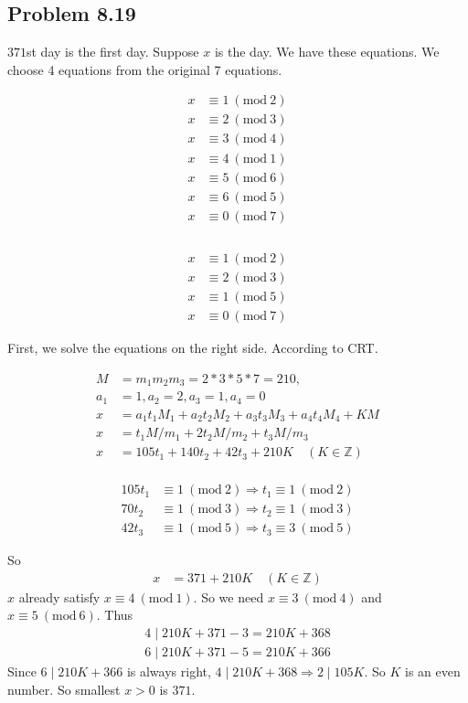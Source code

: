 \documentclass[acmlarge,screen]{acmart}
\begin{document}
\begin{CJK*}{UTF8}{gbsn}
\section{Problem 8.19}
$371$st day is the first day. Suppose $x$ is the day. We have these equations. We choose 4 equations from the original 7 equations.
\begin{multicols}{2}
\begin{align*} 
	x&\equiv1\ (\text{mod}\ 2)\\
	x&\equiv2\ (\text{mod}\ 3)\\
	x&\equiv3\ (\text{mod}\ 4)\\
	x&\equiv4\ (\text{mod}\ 1)\\
	x&\equiv5\ (\text{mod}\ 6)\\
	x&\equiv6\ (\text{mod}\ 5)\\
	x&\equiv0\ (\text{mod}\ 7)\\
\end{align*}
\columnbreak \\
\begin{align*}
	x&\equiv1\ (\text{mod}\ 2)\\
	x&\equiv2\ (\text{mod}\ 3)\\
	x&\equiv1\ (\text{mod}\ 5)\\
	x&\equiv0\ (\text{mod}\ 7)
\end{align*}
\end{multicols}
\noindent First, we solve the equations on the right side. According to CRT.
\begin{multicols}{2}
\begin{align*}
	M&=m_1m_2m_3=2*3*5*7=210,\\
	a_1&=1,a_2=2,a_3=1,a_4=0\\
	x&=a_1t_1M_1+a_2t_2M_2+a_3t_3M_3+a_4t_4M_4+KM\\
	x&=t_1M/m_1+2t_2M/m_2+t_3M/m_3\\
	x&=105t_1+140t_2+42t_3+210K\quad(K \in \mathbb{Z})
\end{align*}
\columnbreak\\
\begin{align*}
	105t_1&\equiv1\ (\text{mod}\ 2)\Rightarrow t_1\equiv1\ (\text{mod}\ 2)\\
	70t_2&\equiv1\ (\text{mod}\ 3)\Rightarrow t_2\equiv1\ (\text{mod}\ 3)\\
	42t_3&\equiv1\ (\text{mod}\ 5)\Rightarrow t_3\equiv3\ (\text{mod}\ 5)
\end{align*}
\end{multicols}
\noindent So
\begin{align*}
	x&=371+210K\quad(K \in \mathbb{Z})
\end{align*}
$x$ already satisfy $x\equiv4\ (\text{mod}\ 1)$. So we need $x\equiv3\ (\text{mod}\ 4)$ and $x\equiv5\ (\text{mod}\ 6)$. Thus
\begin{align*}
4\mid 210K+371-3=210K+368\\
6\mid 210K+371-5=210K+366
\end{align*}
Since $6\mid 210K+366$ is always right, $4\mid210K+368 \Rightarrow 2\mid105K$. So $K$ is an even number. So smallest $x>0$ is $371$.

\end{CJK*}
\end{document}

